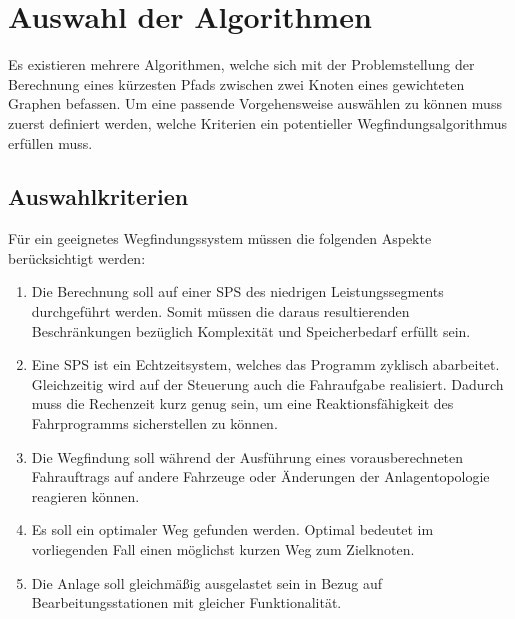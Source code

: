 \section{Auswahl der Algorithmen}

	Es existieren mehrere Algorithmen, welche sich mit der Problemstellung der Berechnung eines kürzesten Pfads zwischen zwei Knoten eines gewichteten Graphen befassen. Um eine passende Vorgehensweise auswählen zu können muss zuerst definiert werden, welche Kriterien ein potentieller Wegfindungsalgorithmus erfüllen muss.
	
	\subsection{Auswahlkriterien}
		\label{Kriterien_Alg}
		Für ein geeignetes Wegfindungssystem müssen die folgenden Aspekte berücksichtigt werden:
		\begin{enumerate}
			\item Die Berechnung soll auf einer \ac{SPS} des niedrigen Leistungssegments durchgeführt werden. Somit müssen die daraus resultierenden Beschränkungen bezüglich Komplexität und Speicherbedarf erfüllt sein.
			\item Eine \ac{SPS} ist ein Echtzeitsystem, welches das Programm zyklisch abarbeitet. Gleichzeitig wird auf der Steuerung auch die Fahraufgabe realisiert. Dadurch muss die Rechenzeit kurz genug sein, um eine Reaktionsfähigkeit des Fahrprogramms sicherstellen zu können.
			\item Die Wegfindung soll während der Ausführung eines vorausberechneten Fahrauftrags auf andere Fahrzeuge oder Änderungen der Anlagentopologie reagieren können.
			\item Es soll ein optimaler Weg gefunden werden. Optimal bedeutet im vorliegenden Fall einen möglichst kurzen Weg zum Zielknoten.
			\item Die Anlage soll gleichmäßig ausgelastet sein in Bezug auf Bearbeitungsstationen mit gleicher Funktionalität.
		\end{enumerate}
		
